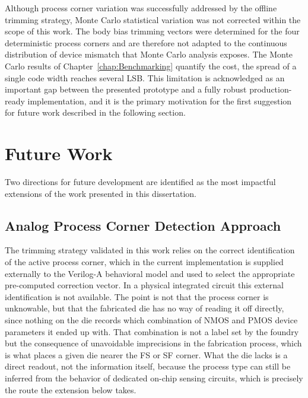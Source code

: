 Although process corner variation was successfully addressed by the
offline trimming strategy, Monte Carlo statistical variation was not corrected within the scope of
this work. The body bias trimming vectors were determined for the four deterministic process
corners and are therefore not adapted to the continuous distribution of device mismatch that Monte
Carlo analysis exposes. The Monte Carlo results of Chapter~\ref{chap:Benchmarking} quantify the
cost, the spread of a single code width reaches several LSB. This limitation is acknowledged as an important gap between the
presented prototype and a fully robust production-ready implementation, and it is the primary
motivation for the first suggestion for future work described in the following section.

\section{Future Work}

Two directions for future development are identified as the most impactful extensions of the
work presented in this dissertation.

\subsection{Analog Process Corner Detection Approach}

The trimming strategy validated in this work relies on the correct identification of the active
process corner, which in the current implementation is supplied externally to the Verilog-A
behavioral model and used to select the appropriate pre-computed correction vector. In a
physical integrated circuit this external identification is not available. The point is not that the
process corner is unknowable, but that the fabricated die has no way of reading it off directly, since
nothing on the die records which combination of NMOS and PMOS device parameters it ended up
with. That combination is not a label set by the foundry but the consequence of unavoidable
imprecisions in the fabrication process, which is what places a given die nearer the FS or SF
corner. What the die lacks is a direct readout, not the information itself, because the process type
can still be inferred from the behavior of dedicated on-chip sensing circuits, which is precisely
the route the extension below takes.

